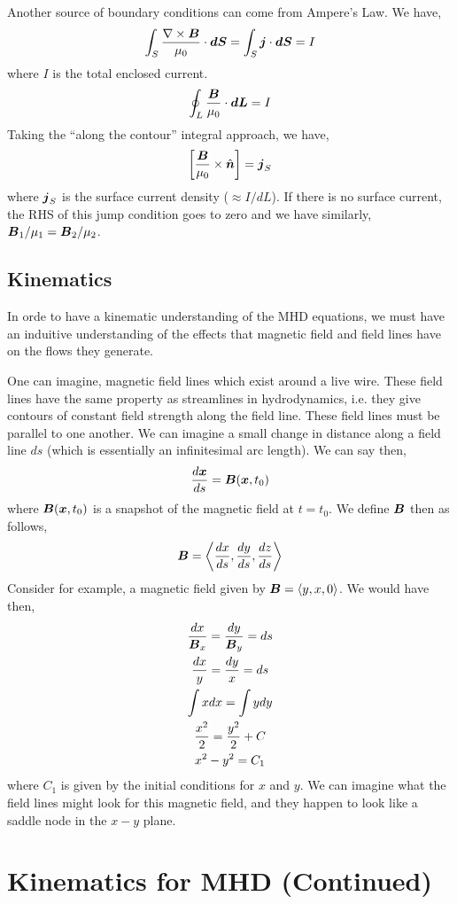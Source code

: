 \documentclass{article}
\begin{document}
Another source of boundary conditions can come from Ampere's Law. We have, 
\begin{gather*}
    \int_S \frac{\nabla\times\boldsymbol{B}}{\mu_0} \cdot\boldsymbol{dS} = \int_S \boldsymbol{j}\cdot\boldsymbol{dS} =
    I
\end{gather*}
where $I$ is the total enclosed current. 
\begin{gather*}
    \oint_L \frac{\boldsymbol{B}}{\mu_0} \cdot\boldsymbol{dL} = I
\end{gather*}
Taking the ``along the contour'' integral approach, we have,
\begin{gather*}
    \left[\frac{\boldsymbol{B}}{\mu_0} \times \hat{\boldsymbol{n}}\right] = \boldsymbol{j}_S
\end{gather*}
where $\boldsymbol{j}_S$ is the surface current density ($\approx I/dL$). If there is no
surface current, the RHS of this jump condition goes to zero and we have
similarly, $\boldsymbol{B}_1/\mu_1 = \boldsymbol{B}_2/\mu_2$. 

\subsection{Kinematics}

In orde to have a kinematic understanding of the MHD equations, we must have an
induitive understanding of the effects that magnetic field and field lines have
on the flows they generate. 

One can imagine, magnetic field lines which exist around a live wire. These
field lines have the same property as streamlines in hydrodynamics, i.e. they
give contours of constant field strength along the field line. These field lines
must be parallel to one another. We can imagine a small change in distance along
a field line $ds$ (which is essentially an infinitesimal arc length). We can
say then, 
\begin{gather*}
   \frac{d\boldsymbol{x}}{ds} = \boldsymbol{B}(\boldsymbol{x},t_0)
\end{gather*}
where $\boldsymbol{B}(\boldsymbol{x},t_0)$ is a snapshot of the magnetic field at $t = t_0$. 
We define $\boldsymbol{B}$ then as follows, 
\begin{gather*}
    \boldsymbol{B} = \left< \frac{dx}{ds}, \frac{dy}{ds},\frac{dz}{ds}\right>
\end{gather*}
Consider for example, a magnetic field given by $\boldsymbol{B} = \left<y, x, 0\right>$. We
would have then, 
\begin{gather*}
    \frac{dx}{\boldsymbol{B}_x} = \frac{dy}{\boldsymbol{B}_y} = ds\\
    \frac{dx}{y} = \frac{dy}{x} = ds\\
    \int xdx = \int ydy \\
    \frac{x^2}{2} = \frac{y^2}{2} + C\\
    x^2 - y^2 = C_1
\end{gather*}
where $C_1$ is given by the initial conditions for $x$ and $y$. We can imagine
what the field lines might look for this magnetic field, and they happen to look
like a saddle node in the $x-y$ plane. 

\section{Kinematics for MHD (Continued)}

\subsection{}
\end{document}
